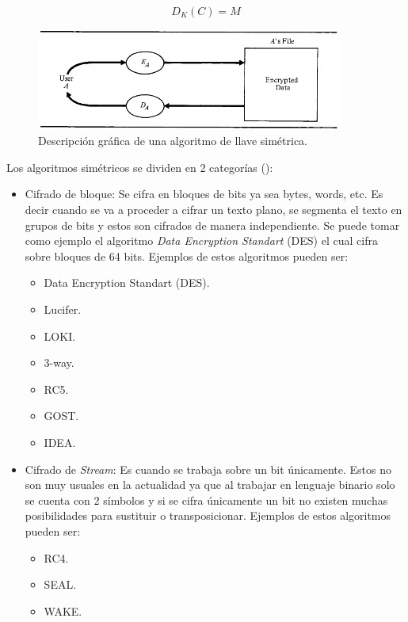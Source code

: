 \begin{equation}\label{eqDescifradoSimetrico}
D_K (C) = M
\end{equation}


\begin{figure}
	\centering
	\includegraphics[width=0.9\textwidth]{./images/figSimmetricKeyAlgorithm}
	\caption{Descripción gráfica de una algoritmo de llave simétrica.}
	\label{figSimmetricKeyAlgorithm}
\end{figure}


Los algoritmos simétricos se dividen en 2 categorías (\cite{bruce}):

\begin{itemize}
\item Cifrado de bloque: Se cifra en bloques de bits ya sea bytes, words, etc. Es decir cuando se va a proceder a cifrar un texto plano, se segmenta el texto en grupos de bits y estos son cifrados de manera independiente. Se puede tomar como ejemplo el algoritmo \textit{Data Encryption Standart} (DES) el cual cifra sobre bloques de 64 bits. Ejemplos de estos algoritmos pueden ser:
\begin{itemize}
\item Data Encryption Standart (DES).
\item Lucifer.
\item LOKI.
\item 3-way.
\item RC5.
\item GOST.
\item IDEA.
\end{itemize}

\item Cifrado de \textit{Stream}: Es cuando se trabaja sobre un bit únicamente. Estos no son muy usuales en la actualidad ya que al trabajar en lenguaje binario solo se cuenta con 2 símbolos y si se cifra únicamente un bit no existen muchas posibilidades para sustituir o transposicionar.
Ejemplos de estos algoritmos pueden ser:
\begin{itemize}
\item RC4.
\item SEAL.
\item WAKE.
\end{itemize}
\end{itemize}

